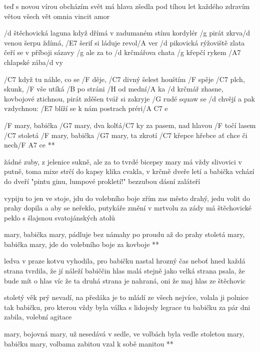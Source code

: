 \rr

teď s novou vírou obcházím svět
má hlava zšedla pod tíhou let
každého zdravím větou všech vět
omnia vincit amor




/d štěchovická laguna když dřímá v zadumaném stínu kordylér
/g pirát zkrva/d venou šerpu ždímá, /E7 šerif si láduje revol/A ver
/d pikovická rýžoviště zlata čeří se v příboji sázavy
/g ale za to /d krčmářova chata /g křepčí rykem /A7 chlapské zába/d vy \s

/C7 když tu náhle, co se /F děje, /C7 divný šelest houštím /F spěje
/C7 plch, skunk, /F vše utíká /B po stráni /{H\dim} od mední/A ka
/d krčmář zhasne, kovbojové ztichnou, pirát zděšen tvář si zakryje
/G rudé squaw se /d chvějí a pak vzdychnou:
/E7 blíží se k nám postrach préri/{A C7} e

\R  /F mary, babička /G7 mary,
    dva kolťá/C7 ky za pasem, nad hlavou /F točí lasem
    /C7 stoletá /F mary, babička /G7 mary,
    ta zkrotí /C7 křepce hřebce ať chce či nech/{F A7} ce **

žádné zuby, z jelenice sukně, ale za to tvrdé bicepsy
mary má vždy slivovici v putně, toma mixe strčí do kapsy
klika cvakla, v krčmě dveře letí a babička vchází do dveří
"pintu ginu, lumpové prokletí!" bezzubou dásní zaláteří \s

vypiju to jen ve stoje, jdu do volebního boje
zřím zas město drahý, jedu volit do prahy
dopila a aby se neřeklo, putykáře změní v mrtvolu
za zády má štěchovické peklo s šlajsnou svatojánských atolů

\R  mary, babička mary,
    pádluje bez námahy po proudu až do prahy
    stoletá mary, babička mary,
    jde do volebního boje za kovboje ** \songgg

ledva v praze kotvu vyhodila, pro babičku nastal hrozný čas
neboť hned každá strana tvrdila, že jí náleží babiččin hlas
malá stejně jako velká strana psala, že bude mít o hlas víc
že ta druhá strana je nahraná, oni že maj hlas ze štěchovic \s

stoletý věk prý nevadí, na předáka je to mládí
ze všech nejvíce, volala ji polnice
tak babičku, pro kterou vždy byla válka s lidojedy legrace
tu babičku za pár dni zabila, volební agitace

\R  mary, bojovná mary,
    už nesedává v sedle, ve volbách byla vedle
    stoletou mary, babičku mary,
    volbama zabitou vzal k sobě manitou **



